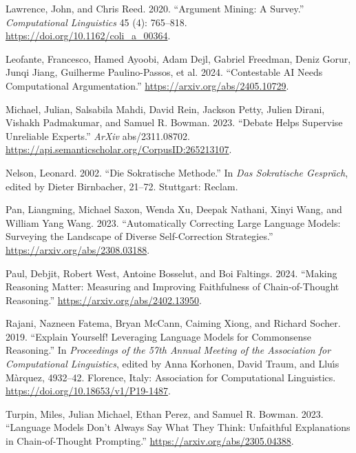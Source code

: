 \documentclass[
  letterpaper,
  DIV=11,
  numbers=noendperiod]{scrartcl}
\newlength{\cslhangindent}
\newlength{\cslentryspacingunit} %
\newenvironment{CSLReferences}[2] %
 {%
  \setlength{\parindent}{0pt}
  \ifodd #1
  \let\oldpar\par
  \def\par{\hangindent=\cslhangindent\oldpar}
  \fi
  \setlength{\parskip}{#2\cslentryspacingunit}
 }%
 {}
\begin{document}
\begin{CSLReferences}{1}{0}
\leavevmode{}%
Lawrence, John, and Chris Reed. 2020. {``{Argument Mining: A Survey}.''}
\emph{Computational Linguistics} 45 (4): 765--818.
\url{https://doi.org/10.1162/coli_a_00364}.

\leavevmode{}%
Leofante, Francesco, Hamed Ayoobi, Adam Dejl, Gabriel Freedman, Deniz
Gorur, Junqi Jiang, Guilherme Paulino-Passos, et al. 2024.
{``Contestable AI Needs Computational Argumentation.''}
\url{https://arxiv.org/abs/2405.10729}.

\leavevmode{}%
Michael, Julian, Salsabila Mahdi, David Rein, Jackson Petty, Julien
Dirani, Vishakh Padmakumar, and Samuel R. Bowman. 2023. {``Debate Helps
Supervise Unreliable Experts.''} \emph{ArXiv} abs/2311.08702.
\url{https://api.semanticscholar.org/CorpusID:265213107}.

\leavevmode{}%
Nelson, Leonard. 2002. {``Die Sokratische Methode.''} In \emph{Das
Sokratische Gespr{ä}ch}, edited by Dieter Birnbacher, 21--72. Stuttgart:
Reclam.

\leavevmode{}%
Pan, Liangming, Michael Saxon, Wenda Xu, Deepak Nathani, Xinyi Wang, and
William Yang Wang. 2023. {``Automatically Correcting Large Language
Models: Surveying the Landscape of Diverse Self-Correction
Strategies.''} \url{https://arxiv.org/abs/2308.03188}.

\leavevmode{}%
Paul, Debjit, Robert West, Antoine Bosselut, and Boi Faltings. 2024.
{``Making Reasoning Matter: Measuring and Improving Faithfulness of
Chain-of-Thought Reasoning.''} \url{https://arxiv.org/abs/2402.13950}.

\leavevmode{}%
Rajani, Nazneen Fatema, Bryan McCann, Caiming Xiong, and Richard Socher.
2019. {``Explain Yourself! Leveraging Language Models for Commonsense
Reasoning.''} In \emph{Proceedings of the 57th Annual Meeting of the
Association for Computational Linguistics}, edited by Anna Korhonen,
David Traum, and Lluı́s Màrquez, 4932--42. Florence, Italy: Association
for Computational Linguistics.
\url{https://doi.org/10.18653/v1/P19-1487}.

\leavevmode{}%
Turpin, Miles, Julian Michael, Ethan Perez, and Samuel R. Bowman. 2023.
{``Language Models Don't Always Say What They Think: Unfaithful
Explanations in Chain-of-Thought Prompting.''}
\url{https://arxiv.org/abs/2305.04388}.

\end{CSLReferences}
\end{document}
